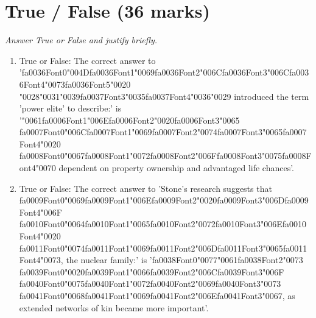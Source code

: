\documentclass[12pt]{article}
\begin{document}
\section*{True / False (36 marks)}
\textit{Answer True or False and justify briefly.}
\begin{enumerate}[label=\arabic*.]
\item True or False: The correct answer to '{\csname fa0036Font0\endcsname\char"004D}{\csname fa0036Font1\endcsname\char"0069}{\csname fa0036Font2\endcsname\char"006C}{\csname fa0036Font3\endcsname\char"006C}{\csname fa0036Font4\endcsname\char"0073}{\csname fa0036Font5\endcsname\char"0020} {\char"0028}{\char"0031}{\char"0039}{\csname fa0037Font3\endcsname\char"0035}{\csname fa0037Font4\endcsname\char"0036}{\char"0029} introduced the term 'power elite' to describe:' is '{\char"0061}{\csname fa0006Font1\endcsname\char"006E}{\csname fa0006Font2\endcsname\char"0020}{\csname fa0006Font3\endcsname\char"0065} {\csname fa0007Font0\endcsname\char"006C}{\csname fa0007Font1\endcsname\char"0069}{\csname fa0007Font2\endcsname\char"0074}{\csname fa0007Font3\endcsname\char"0065}{\csname fa0007Font4\endcsname\char"0020} {\csname fa0008Font0\endcsname\char"0067}{\csname fa0008Font1\endcsname\char"0072}{\csname fa0008Font2\endcsname\char"006F}{\csname fa0008Font3\endcsname\char"0075}{\csname fa0008Font4\endcsname\char"0070} dependent on property ownership and advantaged life chances'.
\item True or False: The correct answer to 'Stone's research suggests that {\csname fa0009Font0\endcsname\char"0069}{\csname fa0009Font1\endcsname\char"006E}{\csname fa0009Font2\endcsname\char"0020}{\csname fa0009Font3\endcsname\char"006D}{\csname fa0009Font4\endcsname\char"006F} {\csname fa0010Font0\endcsname\char"0064}{\csname fa0010Font1\endcsname\char"0065}{\csname fa0010Font2\endcsname\char"0072}{\csname fa0010Font3\endcsname\char"006E}{\csname fa0010Font4\endcsname\char"0020} {\csname fa0011Font0\endcsname\char"0074}{\csname fa0011Font1\endcsname\char"0069}{\csname fa0011Font2\endcsname\char"006D}{\csname fa0011Font3\endcsname\char"0065}{\csname fa0011Font4\endcsname\char"0073}, the nuclear family:' is '{\csname fa0038Font0\endcsname\char"0077}{\char"0061}{\csname fa0038Font2\endcsname\char"0073} {\csname fa0039Font0\endcsname\char"0020}{\csname fa0039Font1\endcsname\char"0066}{\csname fa0039Font2\endcsname\char"006C}{\csname fa0039Font3\endcsname\char"006F} {\csname fa0040Font0\endcsname\char"0075}{\csname fa0040Font1\endcsname\char"0072}{\csname fa0040Font2\endcsname\char"0069}{\csname fa0040Font3\endcsname\char"0073} {\csname fa0041Font0\endcsname\char"0068}{\csname fa0041Font1\endcsname\char"0069}{\csname fa0041Font2\endcsname\char"006E}{\csname fa0041Font3\endcsname\char"0067}, as extended networks of kin became more important'.

\end{enumerate}
\end{document}

